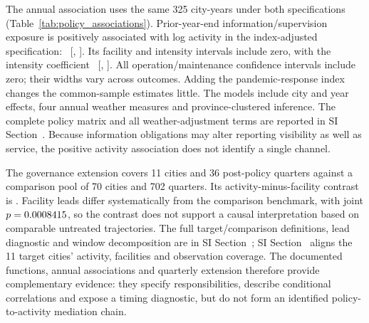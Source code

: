 The annual association uses the same 325 city-years under both specifications (Table~\ref{tab:policy_associations}). Prior-year-end information/supervision exposure is positively associated with log activity in the index-adjusted specification: \PolicyRActivity\ [\PolicyRActivityLow, \PolicyRActivityHigh]. Its facility and intensity intervals include zero, with the intensity coefficient \PolicyRIntensity\ [\PolicyRIntensityLow, \PolicyRIntensityHigh]. All operation/maintenance confidence intervals include zero; their widths vary across outcomes. Adding the pandemic-response index changes the common-sample estimates little. The models include city and year effects, four annual weather measures and province-clustered inference. The complete policy matrix and all weather-adjustment terms are reported in SI Section~. Because information obligations may alter reporting visibility as well as service, the positive activity association does not identify a single channel.

The governance extension covers 11 cities and 36 post-policy quarters against a comparison pool of 70 cities and 702 quarters. Its activity-minus-facility contrast is \HOneD. Facility leads differ systematically from the comparison benchmark, with joint $p=0.0008415$, so the contrast does not support a causal interpretation based on comparable untreated trajectories. The full target/comparison definitions, lead diagnostic and window decomposition are in SI Section~; SI Section~ aligns the 11 target cities' activity, facilities and observation coverage. The documented functions, annual associations and quarterly extension therefore provide complementary evidence: they specify responsibilities, describe conditional correlations and expose a timing diagnostic, but do not form an identified policy-to-activity mediation chain.


